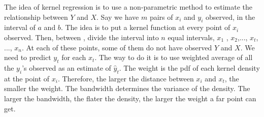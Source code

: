 The idea of kernel regression is to use a non-parametric method to
estimate the relationship between $Y$ and $X$.  Say we have $m$ pairs
of $x_i$ and $y_i$ observed, in the interval of $a$ and $b$.  The idea is
to put a kernel function at every point of $x_i$ observed. Then, between
, divide the interval into $n$ equal intervals, $x_1$ , $x_2$,...,
$x_t$, ..., $x_n$.  At each of these points, some of them do not have
observed $Y$ and $X$.  We need to predict $y_t$ for each $x_t$.  The
way to do it is to use weighted average of all the $y_i$'s observed as
an estimate of $\hat y_t$.  The weight is the pdf of each kernel density at
the point of $x_i$.  Therefore, the larger the distance between $x_i$
and $x_t$, the smaller the weight.  The bandwidth determines the
variance of the density.  The larger the bandwidth, the flater the
density, the larger the weight a far point can get.
